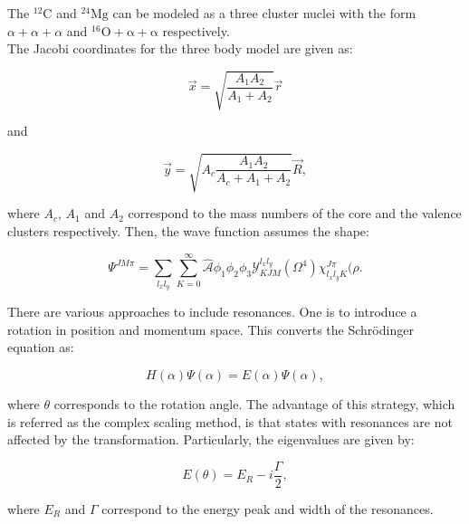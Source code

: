 \documentclass[openany]{book}
\begin{document}
The $\mathrm{{}^{12}C}$ and $\mathrm{{}^{24}Mg}$ can be modeled as a three cluster nuclei with the form $\alpha + \alpha + \alpha$ and $\mathrm{{}^{16}O + \alpha + \alpha}$ respectively. \\

The Jacobi coordinates for the three body model are given as: 

\begin{equation}\label{eq:middleFusion_threeBody_cluster_x}
	\vec x = \sqrt{ \frac{A_1A_2}{A_1 + A_2}} \vec r 
\end{equation}

and 

\begin{equation}\label{eq:middleFusion_threeBody_cluster_y}
	\vec y = \sqrt{ A_c\frac{A_1A_2}{A_c + A_1 + A_2}} \vec R, 
\end{equation}

where $A_c$, $A_1$ and $A_2$ correspond to the mass numbers of the core and the valence clusters respectively. Then, the wave function assumes the shape: 

\begin{equation}\label{eq:middleFusion_threeBody_waveFunction}
	\Psi^{JM\pi} = \sum_{l_xl_y} \sum_{K = 0}^{\infty} { \hat{ \mathcal{A}} {\phi_1 \phi_2 \phi_3}  \mathcal{Y}^{l_x l_y}_{KJM}(\Omega^4) \chi^{J\pi}_{l_x l_y K}(\rho}.
\end{equation}

There are various approaches to include resonances. One is to introduce a rotation in position and momentum space. This converts the Schrödinger equation as: 

\begin{equation}\label{eq:middleFusion_threeBody_resonances_rotation}
	H(\alpha) \Psi (\alpha) = E(\alpha) \Psi (\alpha),
\end{equation}

where $\theta$ corresponds to the rotation angle. The advantage of this strategy, which is referred as the complex scaling method, is that states with resonances are not affected by the transformation. Particularly, the eigenvalues are given by: 

\begin{equation}\label{eq:middleFusion_threeBody_resonances_rotation_eigenValues}
	E(\theta) = E_R - i \frac{\Gamma}{2},
\end{equation}

where $E_R$ and $\Gamma$ correspond to the energy peak and width of the resonances.\\
\end{document}
